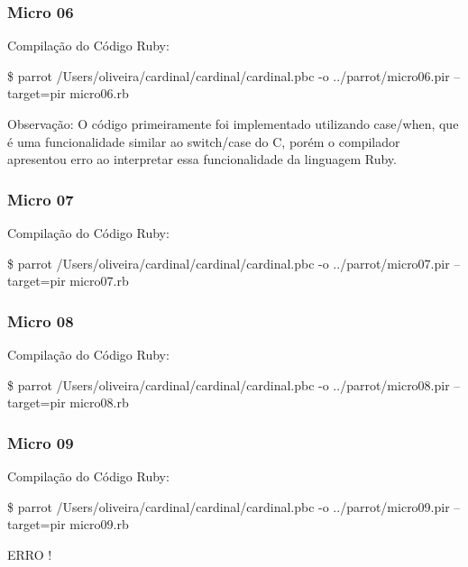 \documentclass[12pt,a4paper,twoside]{report}
\begin{document}
\subsubsection{Micro 06}


Compilação do Código Ruby:
\begin{terminal}
\$ parrot /Users/oliveira/cardinal/cardinal/cardinal.pbc -o
../parrot/micro06.pir --target=pir micro06.rb
\end{terminal}
Observação: O código primeiramente foi implementado utilizando
case/when, que é uma funcionalidade similar ao switch/case do C, porém
o compilador apresentou erro ao interpretar essa funcionalidade da
linguagem Ruby.


\subsubsection{Micro 07}


Compilação do Código Ruby:
\begin{terminal}
\$ parrot /Users/oliveira/cardinal/cardinal/cardinal.pbc -o
../parrot/micro07.pir --target=pir micro07.rb
\end{terminal}


\subsubsection{Micro 08}


Compilação do Código Ruby:
\begin{terminal}
\$ parrot /Users/oliveira/cardinal/cardinal/cardinal.pbc -o
../parrot/micro08.pir --target=pir micro08.rb
\end{terminal}


\subsubsection{Micro 09}


Compilação do Código Ruby:
\begin{terminal}
\$ parrot /Users/oliveira/cardinal/cardinal/cardinal.pbc -o
../parrot/micro09.pir --target=pir micro09.rb
\end{terminal}
ERRO !
\end{document}
